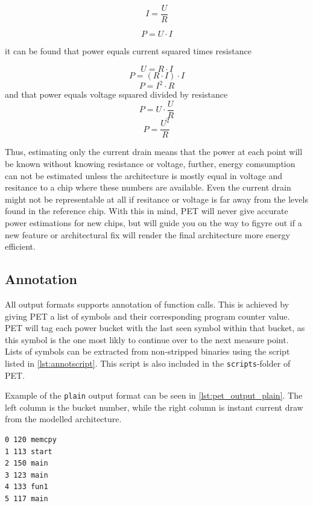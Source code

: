\begin{equation}
I=\frac{U}{R}
\label{eq:ohm}
\end{equation}

\begin{equation}
P=U \cdot I
\label{eq:power}
\end{equation}

it can be found that power equals current squared times resistance

\[U=R \cdot I\]
\[P=(R \cdot I) \cdot I\]
\[P=I^2 \cdot R\]
and that power equals voltage squared divided by resistance
\[P=U \cdot \frac{U}{R}\]
\[P=\frac{U^2}{R}\]

Thus, estimating only the current drain means that the power at each point will
be known without knowing resistance or voltage, further, energy comsumption can
not be estimated unless the architecture is mostly equal in voltage and
resitance to a chip where these numbers are available. Even the current drain
might not be representable at all if resitance or voltage is far away from the
levels found in the reference chip. With this in mind, PET will never give
accurate power estimations for new chips, but will guide you on the way to
figyre out if a new feature or architectural fix will render the final
architecture more energy efficient.

\subsection{Annotation}

All output formats supports annotation of function calls. This is achieved by
giving PET a list of symbols and their corresponding program counter value. PET
will tag each power bucket with the last seen symbol within that bucket, as this
symbol is the one most likly to continue over to the next measure point. Lists
of symbols can be extracted from non-stripped binaries using the script listed
in \autoref{lst:annotscript}. This script is also included in the \texttt{scripts}-folder
of PET.



Example of the \texttt{plain} output format can be seen in
\autoref{lst:pet_output_plain}. The left column is the bucket number, while the
right column is instant current draw from the modelled architecture.

\begin{lstlisting}[float=hbt,label={lst:pet_output_plain},caption={PET Plain Output}]
0 120 memcpy
1 113 start
2 150 main
3 123 main
4 133 fun1
5 117 main
\end{lstlisting}

